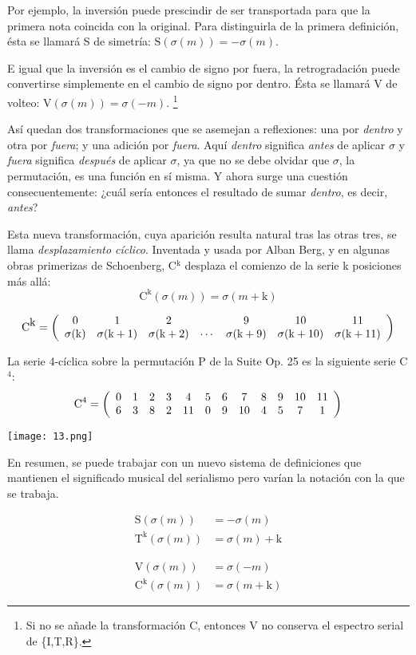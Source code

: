 		Por ejemplo, la inversi\'on puede prescindir de ser transportada para que la primera nota coincida con la original. Para distinguirla de la primera definici\'on, \'esta se llamar\'a S de simetr\'ia: $\mbox{S}(\sigma(m)) = -\sigma(m)$.
		
		E igual que la inversi\'on es el cambio de signo por fuera, la retrogradaci\'on puede convertirse simplemente en el cambio de signo por dentro. \'Esta se llamar\'a V de volteo: $\mbox{V}(\sigma(m)) = \sigma(-m)$. \footnote{Si no se a\~nade la transformaci\'on C, entonces V no conserva el espectro serial de \{I,T,R\}.}
		
		As\'i quedan dos transformaciones que se asemejan a reflexiones: una por \textit{dentro} y otra por \textit{fuera}; y una adici\'on por \textit{fuera}. Aqu\'i \textit{dentro} significa \textit{antes} de aplicar $\sigma$ y \textit{fuera} significa \textit{despu\'es} de aplicar $\sigma$, ya que no se debe olvidar que $\sigma$, la permutaci\'on, es una funci\'on en s\'i misma. Y ahora surge una cuesti\'on consecuentemente: ¿cu\'al ser\'ia entonces el resultado de sumar \textit{dentro}, es decir, \textit{antes}?
		
		Esta nueva transformaci\'on, cuya aparici\'on resulta natural tras las otras tres, se llama \textit{desplazamiento c\'iclico}. Inventada y usada por Alban Berg, y en algunas obras primerizas de Schoenberg, C$^{\mbox{k}}$ desplaza el comienzo de la serie k posiciones m\'as all\'a:
		\[\mbox{C}^{\mbox{k}}(\sigma(m))=\sigma(m+\mbox{k})\]	
			
		\[\mbox{C}^{\mbox{k}}=
		\left(\begin{array}{*{7}c}
		0&1&2&&9&10&11\\
		\sigma(\mbox{k})&\sigma(\mbox{k}+1)&\sigma(\mbox{k}+2)&\cdots&\sigma(\mbox{k}+9)&\sigma(\mbox{k}+10)&\sigma(\mbox{k}+11)\\
		\end{array}\right)\]
		
		La serie 4-c\'iclica sobre la permutaci\'on P de la Suite Op. 25 es la siguiente serie C$^4$:	
		\[\mbox{C}^4=\drow{6,3,8,2,11,0,9,10,4,5,7,1}\]		
		\begin{center}
			\texttt{[image: 13.png]}
		\end{center}
				
		En resumen, se puede trabajar con un nuevo sistema de definiciones que mantienen el significado musical del serialismo pero var\'ian la notaci\'on con la que se trabaja. 
		
		\begin{multicols}{2}
		\begin{align*}
		\mbox{S}(\sigma(m)) &= -\sigma(m)\\
		\mbox{T}^{\mbox{k}}(\sigma(m)) &= \sigma(m) + \mbox{k}
		\end{align*}
		
		\begin{align*}
		\mbox{V}(\sigma(m)) &= \sigma(-m)\\
		\mbox{C}^{\mbox{k}}(\sigma(m)) &= \sigma(m+\mbox{k})
		\end{align*}
		\end{multicols}
	
